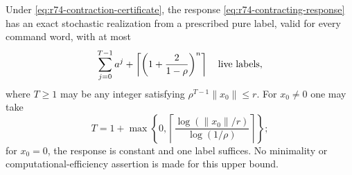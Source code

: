 \begin{theorem}\label{thm:r74-contraction}
Under \eqref{eq:r74-contraction-certificate}, the response
\eqref{eq:r74-contracting-response} has an exact stochastic realization from
a prescribed pure label, valid for every command word, with at most
\begin{equation}\label{eq:r74-contraction-count}
 \sum_{j=0}^{T-1}a^j+
 \left\lceil\left(1+\frac{2}{1-\rho}\right)^n\right\rceil
 \quad\hbox{live labels},
\end{equation}
where $T\ge1$ may be any integer satisfying
$\rho^{T-1}\|x_0\|\le r$. For $x_0\ne0$ one may take
\[
 T=1+\max\left\{0,
 \left\lceil\frac{\log(\|x_0\|/r)}{\log(1/\rho)}\right\rceil\right\};
\]
for $x_0=0$, the response is constant and one label suffices. No minimality or
computational-efficiency assertion is made for this upper bound.
\end{theorem}
